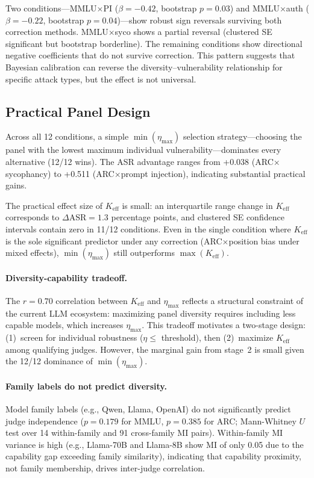 \documentclass[11pt,a4paper]{article}
\newcommand{\etamax}{\ensuremath{\eta_{\max}}}
\newcommand{\keff}{\ensuremath{K_{\text{eff}}}}
\begin{document}
Two conditions---MMLU$\times$PI ($\beta=-0.42$, bootstrap $p=0.03$) and MMLU$\times$auth ($\beta=-0.22$, bootstrap $p=0.04$)---show robust sign reversals surviving both correction methods.
MMLU$\times$syco shows a partial reversal (clustered SE significant but bootstrap borderline).
The remaining conditions show directional negative coefficients that do not survive correction.
This pattern suggests that Bayesian calibration can reverse the diversity--vulnerability relationship for specific attack types, but the effect is not universal.

\subsection{Practical Panel Design}
\label{sec:practical}

Across all 12 conditions, a simple $\min(\etamax)$ selection strategy---choosing the panel with the lowest maximum individual vulnerability---dominates every alternative (12/12 wins).
The ASR advantage ranges from +0.038 (ARC$\times$sycophancy) to +0.511 (ARC$\times$prompt injection), indicating substantial practical gains.

The practical effect size of $\keff$ is small: an interquartile range change in $\keff$ corresponds to $\Delta\text{ASR}=1.3$ percentage points, and clustered SE confidence intervals contain zero in 11/12 conditions.
Even in the single condition where $\keff$ is the sole significant predictor under any correction (ARC$\times$position bias under mixed effects), $\min(\etamax)$ still outperforms $\max(\keff)$.

\paragraph{Diversity-capability tradeoff.}
The $r=0.70$ correlation between $\keff$ and $\etamax$ reflects a structural constraint of the current LLM ecosystem: maximizing panel diversity requires including less capable models, which increases $\etamax$.
This tradeoff motivates a two-stage design: (1)~screen for individual robustness ($\eta \leq$ threshold), then (2)~maximize $\keff$ among qualifying judges.
However, the marginal gain from stage~2 is small given the 12/12 dominance of $\min(\etamax)$.

\paragraph{Family labels do not predict diversity.}
Model family labels (e.g., Qwen, Llama, OpenAI) do not significantly predict judge independence ($p=0.179$ for MMLU, $p=0.385$ for ARC; Mann-Whitney $U$ test over 14 within-family and 91 cross-family MI pairs).
Within-family MI variance is high (e.g., Llama-70B and Llama-8B show MI of only 0.05 due to the capability gap exceeding family similarity), indicating that capability proximity, not family membership, drives inter-judge correlation.
\end{document}
